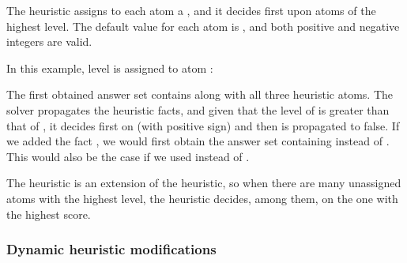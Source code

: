 The  heuristic assigns to each atom a , and it decides first upon atoms of the highest level.
The default value for each atom is ,  and both positive and negative integers are valid.
\begin{example} 
\label{example:level}
In this example,  
level  is assigned to atom :

The first obtained answer set contains  along with all three heuristic atoms.
The solver propagates the heuristic facts, and given that the level of  is greater than that of ,
it decides first on  (with positive sign) and then  is propagated to false.
If we added the fact , 
we would first obtain the answer set containing  instead of .
This would also be the case if we used  instead of .
\end{example}

\begin{note}
The  heuristic is an extension of the  heuristic, 
so when there are many unassigned atoms with the highest level,
the heuristic decides, among them, on the one with the highest  score.
\end{note}

\subsubsection{Dynamic heuristic modifications}

